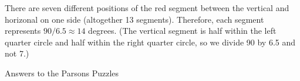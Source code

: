 \documentclass[11pt,a4paper,english]{article}
\begin{document}
There are seven different positions of the red segment between the
vertical and horizonal on one side (altogether 13 segments). Therefore, each segment represents
$90 / 6.5 \approx 14$ degrees. (The vertical segment is half within the
left quarter circle and half within the right quarter circle, so we
divide 90 by 6.5 and not 7.)

\newpage

\newcommand*{\eblock}{\framebox[40pt]{\rule[-11pt]{0pt}{32pt}}\ }
\newcommand*{\eblockbig}{\framebox[58pt]{\rule[-5pt]{0pt}{20pt}}\ }
\newcommand*{\eblocksm}{\framebox[30pt]{\rule[-5pt]{0pt}{20pt}}\ }

\begin{center}
\begin{Large}
\begin{bfseries}
Answers to the Parsons Puzzles
\end{bfseries}
\end{Large}
\end{center}
\end{document}
